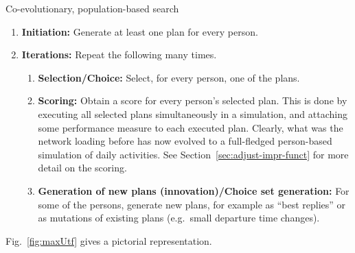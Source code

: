 \begin{algorithm}[H]

\caption{Co-evolutionary, population-based search}

\begin{enumerate}
\item \textbf{Initiation:} Generate at least one plan for every
  person. 

\item \textbf{Iterations:} Repeat the following many times.

\begin{enumerate}

\item \textbf{Selection/Choice:} Select, for every person, one of the plans.

\item \textbf{Scoring:} Obtain a score for every person's selected
  plan.  This is done by executing all selected plans simultaneously
  in a simulation, and attaching some performance measure to each
  executed plan.  Clearly, what was the network loading before has now
  evolved to a full-fledged person-based simulation of daily
  activities.  See Section~\ref{sec:adjust-impr-funct} for more detail on
  the scoring.

\item \textbf{Generation of new plans (innovation)/Choice set
  generation:} For some of the persons, generate new plans, for
  example as ``best replies'' or as mutations of existing plans
  (e.g.\ small departure time changes).

\end{enumerate} %

\end{enumerate}

\end{algorithm}

Fig.~\ref{fig:maxUtf} gives a pictorial representation.

